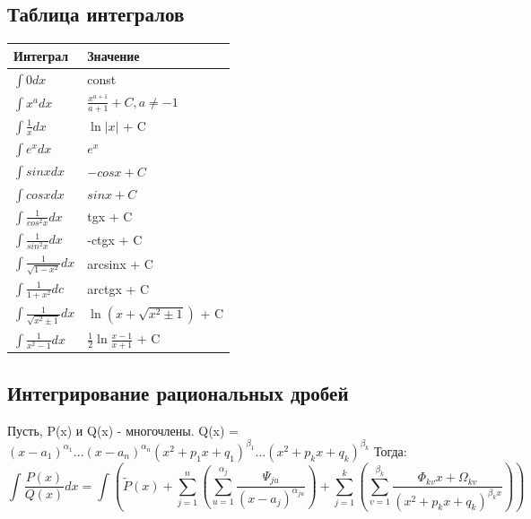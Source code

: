 \documentclass[12pt]{article}
\begin{document}
\subsection{Таблица интегралов}
\begin{center}
\begin{tabular} {|>{\centering\arraybackslash}m{1in} | >{\centering\arraybackslash}m{1in} |}
\hline
Интеграл & Значение \\ [2ex]
\hline
$\int 0dx$ & const \\ [5ex]
\hline
$\int x^{a}dx$ & $\frac{x^{a+1}}{a+1} + C, a \ne -1$ \\ [5ex]
\hline 

$\int \frac{1}{x}dx$ & $\ln|x|$ + C\footnotemark\\ [5ex]
\hline
$\int e^{x}dx$ & $e^{x}$ \\ [5ex]
\hline
$\int sinxdx$ & $-cosx + C$ \\ [5ex]
\hline
$\int cosxdx$ & $sinx + C$ \\ [5ex]
\hline
$\int \frac{1}{cos^{2}x}dx$ & tgx + C \\ [5ex]
\hline 
$\int \frac{1}{sin^{2}x}dx$ & -ctgx + C \\ [5ex]
\hline
$\int \frac{1}{\sqrt{1-x^2}}dx$ & arcsinx + C \\ [5ex]
\hline
$\int \frac{1}{1+x^2}dc$ & arctgx + C \\ [5ex]
\hline
$\int \frac{1}{\sqrt{x^{2} \pm 1}}dx$ & $\ln(x + \sqrt{x^{2} \pm 1})$ + C\footnotemark\\ [5ex]
\hline 
$\int \frac{1}{x^{2}-1}dx$ & $\frac{1}{2}\ln \frac{x-1}{x+1}$ + C\footnotemark \\ [5ex]
\hline
\end{tabular}
\end{center}
\newpage
\subsection{Интегрирование рациональных дробей}

\quad Пусть, P(x) и Q(x) - многочлены. Q(x) = $(x-a_{1})^{\alpha_{1}}...(x-a_{n})^{\alpha_{n}}(x^2 + p_{1}x + q_{1})^{\beta_{1}}...(x^2 + p_{k}x + q_{k})^{\beta_{k}}$ Тогда: $$\int \frac{P(x)}{Q(x)}dx = \int (\widetilde{P}(x) + \sum_{j=1}^{n}(\sum_{u=1}^{\alpha_{j}}\frac{\Psi_{ju}}{(x-a_j)^{\alpha_{ju}}}) + \sum_{j=1}^{k}(\sum_{v=1}^{\beta_{k}}\frac{\Phi_{kv} x + \Omega_{kv}}{(x^2 + p_{k}x+q_{k})^{\beta_kx}}))$$
\end{document}
